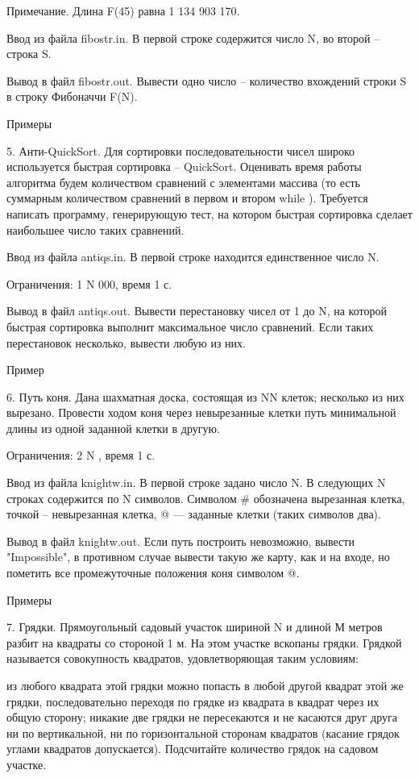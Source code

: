 \documentclass[]{article}
\begin{document}
Примечание. Длина F(45) равна 1 134 903 170.

Ввод из файла fibostr.in. В первой строке содержится число N, во второй – строка S.

Вывод в файл fibostr.out. Вывести одно число – количество вхождений строки S в строку Фибоначчи F(N).

Примеры



5. Анти-QuickSort. Для сортировки последовательности чисел широко используется быстрая сортировка – QuickSort. Оценивать время работы алгоритма будем количеством сравнений с элементами массива (то есть суммарным количеством сравнений в первом и втором while ). Требуется написать программу, генерирующую тест, на котором быстрая сортировка сделает наибольшее число таких сравнений.

Ввод из файла antiqs.in. В первой строке находится единственное число N.

Ограничения: 1 \leq N  000, время 1 с.

Вывод в файл antiqs.out. Вывести перестановку чисел от 1 до N, на которой быстрая сортировка выполнит максимальное число сравнений. Если таких перестановок несколько, вывести любую из них.

Пример



6. Путь коня. Дана шахматная доска, состоящая из N\times N клеток; несколько из них вырезано. Провести ходом коня через невырезанные клетки путь минимальной длины из одной заданной клетки в другую.

Ограничения: 2 \leq N , время 1 с.

Ввод из файла knightw.in. В первой строке задано число N. В следующих N строках содержится по N символов. Символом # обозначена вырезанная клетка, точкой – невырезанная клетка, @ — заданные клетки (таких символов два).

Вывод в файл knightw.out. Если путь построить невозможно, вывести "Impossible", в противном случае вывести такую же карту, как и на входе, но пометить все промежуточные положения коня символом @.

Примеры



7. Грядки. Прямоугольный садовый участок шириной N и длиной М метров разбит на квадраты со стороной 1 м. На этом участке вскопаны грядки. Грядкой называется совокупность квадратов, удовлетворяющая таким условиям:

из любого квадрата этой грядки можно попасть в любой другой квадрат этой же грядки, последовательно переходя по грядке из квадрата в квадрат через их общую сторону;
никакие две грядки не пересекаются и не касаются друг друга ни по вертикальной, ни по горизонтальной сторонам квадратов (касание грядок углами квадратов допускается).
Подсчитайте количество грядок на садовом участке.
\end{document}
